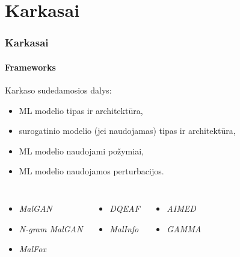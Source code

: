 \section{Karkasai}
\begin{frame}
    \frametitle{Karkasai}
    \framesubtitle{Frameworks}
    Karkaso sudedamosios dalys:\pause
    \begin{itemize}
        \item ML modelio tipas ir architektūra, \pause
        \item surogatinio modelio (jei naudojamas) tipas ir architektūra, \pause
        \item ML modelio naudojami požymiai, \pause
        \item ML modelio naudojamos perturbacijos.
    \end{itemize}\pause
    \vspace{20pt}
    \begin{columns}[t]
        \vspace{10pt}
        \begin{itemize}
            \item \textit{MalGAN}
            \item \textit{N-gram MalGAN}
            \item \textit{MalFox}
        \end{itemize}\pause
        \vspace{10pt}
        \begin{itemize}
            \item \textit{DQEAF}
            \item \textit{MalInfo}
        \end{itemize}\pause
        \vspace{10pt}
        \begin{itemize}
            \item \textit{AIMED}
            \item \textit{GAMMA}
        \end{itemize}
    \end{columns}
\end{frame}

